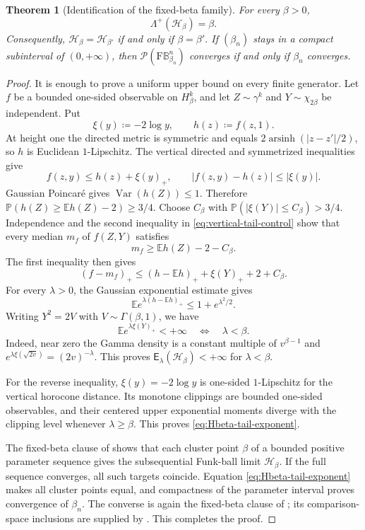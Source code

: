 \documentclass[10pt,a4paper]{amsart}
\numberwithin{equation}{section}
\newtheorem{theorem}{Theorem}[section]
\newcommand{\BetaBall}{\mathrm F\mathbb B^n_{\beta_n}}
\newcommand{\Pyr}{\mathcal P}
\newcommand{\Var}{\operatorname{Var}}
\DeclareMathOperator{\arsinh}{arsinh}
\begin{document}
\begin{theorem}[Identification of the fixed-beta family]\label{thm:Hbeta-classification}
For every $\beta>0$,
\begin{equation}\label{eq:Hbeta-tail-exponent} \Lambda^+(\mathcal H_\beta)=\beta. \end{equation}
Consequently, $\mathcal H_\beta=\mathcal H_{\beta'}$ if and only if $\beta=\beta'$.  If $(\beta_n)$ stays in a compact subinterval of $(0,+\infty)$, then $\Pyr(\BetaBall)$ converges if and only if $\beta_n$ converges.
\end{theorem}

\begin{proof}
It is enough to prove a uniform upper bound on every finite generator.  Let $f$ be a bounded one-sided observable on $H_\beta^k$, and let $Z\sim\gamma^k$ and $Y\sim\chi_{2\beta}$ be independent.  Put
\[ \xi(y)\coloneqq-2\log y, \qquad h(z)\coloneqq f(z,1). \]
At height one the directed metric is symmetric and equals $2\arsinh(|z-z'|/2)$, so $h$ is Euclidean $1$-Lipschitz.  The vertical directed and symmetrized inequalities give
\begin{equation}\label{eq:vertical-tail-control} f(z,y)\le h(z)+\xi(y)_+, \qquad |f(z,y)-h(z)|\le|\xi(y)|. \end{equation}
Gaussian Poincar\'e gives $\Var(h(Z))\le1$.  Therefore
$\mathbb P(h(Z)\ge\mathbb Eh(Z)-2)\ge3/4$.  Choose $C_\beta$ with $\mathbb P(|\xi(Y)|\le C_\beta)>3/4$.  Independence and the second inequality in \eqref{eq:vertical-tail-control} show that every median $m_f$ of $f(Z,Y)$ satisfies
\[ m_f\ge\mathbb Eh(Z)-2-C_\beta. \]
The first inequality then gives
\[ (f-m_f)_+ \le(h-\mathbb Eh)_++\xi(Y)_++2+C_\beta. \]
For every $\lambda>0$, the Gaussian exponential estimate gives
\[ \mathbb E e^{\lambda(h-\mathbb Eh)_+} \le1+e^{\lambda^2/2}. \]
Writing $Y^2=2V$ with $V\sim\Gamma(\beta,1)$, we have
\[ \mathbb E e^{\lambda\xi(Y)_+}<+\infty \quad\Longleftrightarrow\quad\lambda<\beta. \]
Indeed, near zero the Gamma density is a constant multiple of $v^{\beta-1}$ and $e^{\lambda\xi(\sqrt{2v})}=(2v)^{-\lambda}$.  This proves $\mathsf E_\lambda(\mathcal H_\beta)<+\infty$ for $\lambda<\beta$.

For the reverse inequality, $\xi(y)=-2\log y$ is one-sided $1$-Lipschitz for the vertical horocone distance.  Its monotone clippings are bounded one-sided observables, and their centered upper exponential moments diverge with the clipping level whenever $\lambda\ge\beta$.  This proves \eqref{eq:Hbeta-tail-exponent}.

The fixed-beta clause of  shows that each cluster point $\beta$ of a bounded positive parameter sequence gives the subsequential Funk-ball limit $\mathcal H_\beta$.  If the full sequence converges, all such targets coincide.  Equation \eqref{eq:Hbeta-tail-exponent} makes all cluster points equal, and compactness of the parameter interval proves convergence of $\beta_n$.  The converse is again the fixed-beta clause of ; its comparison-space inclusions are supplied by .  This completes the proof.
\end{proof}
\end{document}
